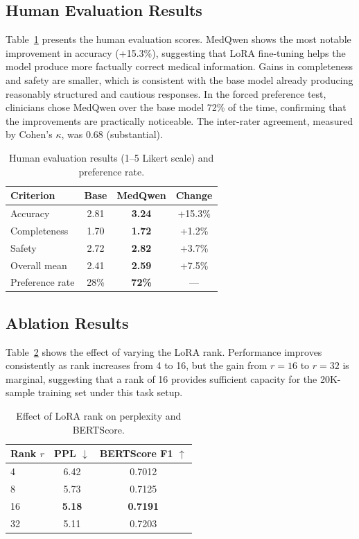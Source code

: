 \documentclass[11pt,a4paper]{article}
\begin{document}
\subsection{Human Evaluation Results}

Table~\ref{tab:human_results} presents the human evaluation scores. MedQwen shows the most notable improvement in accuracy (+15.3\%), suggesting that LoRA fine-tuning helps the model produce more factually correct medical information. Gains in completeness and safety are smaller, which is consistent with the base model already producing reasonably structured and cautious responses. In the forced preference test, clinicians chose MedQwen over the base model 72\% of the time, confirming that the improvements are practically noticeable. The inter-rater agreement, measured by Cohen's $\kappa$, was 0.68 (substantial).

\begin{table}[ht]
\centering
\caption{Human evaluation results (1--5 Likert scale) and preference rate.}
\label{tab:human_results}
\begin{tabular}{lccc}
\toprule
\textbf{Criterion} & \textbf{Base} & \textbf{MedQwen} & \textbf{Change} \\
\midrule
Accuracy & 2.81 & \textbf{3.24} & +15.3\% \\
Completeness & 1.70 & \textbf{1.72} & +1.2\% \\
Safety & 2.72 & \textbf{2.82} & +3.7\% \\
\midrule
Overall mean & 2.41 & \textbf{2.59} & +7.5\% \\
Preference rate & 28\% & \textbf{72\%} & --- \\
\bottomrule
\end{tabular}
\end{table}

\subsection{Ablation Results}

Table~\ref{tab:ablation_rank} shows the effect of varying the LoRA rank. Performance improves consistently as rank increases from 4 to 16, but the gain from $r=16$ to $r=32$ is marginal, suggesting that a rank of 16 provides sufficient capacity for the 20K-sample training set under this task setup.

\begin{table}[ht]
\centering
\caption{Effect of LoRA rank on perplexity and BERTScore.}
\label{tab:ablation_rank}
\begin{tabular}{lcc}
\toprule
\textbf{Rank $r$} & \textbf{PPL $\downarrow$} & \textbf{BERTScore F1 $\uparrow$} \\
\midrule
4 & 6.42 & 0.7012 \\
8 & 5.73 & 0.7125 \\
16 & \textbf{5.18} & \textbf{0.7191} \\
32 & 5.11 & 0.7203 \\
\bottomrule
\end{tabular}
\end{table}
\end{document}

